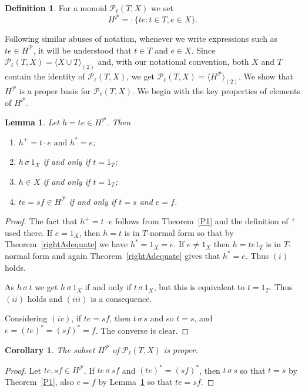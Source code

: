 \documentclass[12pt]{amsart}
\newtheorem{lem}[them]{Lemma}
\newtheorem{cor}[them]{Corollary}
\theoremstyle{definition}
\newtheorem{defn}[them]{Definition}
\theoremstyle{definition}
\numberwithin{them}{section}
\numberwithin{equation}{section}
\begin{document}
{{\begin{defn}\label{defn:H} For a monoid $\mathcal{P}_{\ell}(T,X)$ we set
\[H^{\mathcal{P}}=: \{ te:t\in T, e\in X\}.\]\end{defn}

 Following similar abuses of notation, whenever we write expressions such as $te\in H^{\mathcal{P}}$, it will be understood that $t\in T$ and $e\in X$. 
Since $\mathcal{P}_{\ell}(T,X)=\langle X\cup T\rangle_{(2)}$  
and, with our notational convention, both $X$ and $T$ contain the identity of  $\mathcal{P}_{\ell}(T,X)$, we get
$\mathcal{P}_{\ell}(T,X)=\langle H^{\mathcal{P}}\rangle_{(2)}$. 
We  show that $H^{\mathcal{P}}$ is a proper   basis for $\mathcal{P}_{\ell}(T,X)$. We begin with  the key properties of  elements of $H^{\mathcal{P}}$. 

\begin{lem}\label{lem:HH}  Let  $h=te\in H^{\mathcal{P}}$. Then
\begin{enumerate} 
\item[$(i)$]
$h^+=t\cdot e\mbox{ and }h^*=e$;
\item[$(ii)$] $h\,\sigma\, 1_X$ if and only if $t=1_T$;
\item[$(iii)$] 
$h\in X$ if and only if $t=1_T$;
\item[$(iv)$]   $te=sf\in H^{\mathcal{P}}$ if and only if $t=s$ and $e=f$.\end{enumerate} 
\end{lem}
\begin{proof}  The fact that $h^+=t\cdot e$ follows from Theorem~\ref{P1} and the definition of $^+$ used there. If $e=1_X$, then $h=t$  is in $T$-normal form so that by Theorem~\ref{rightAdequate} we have $h^*=1_X=e$. If $e\neq 1_X$ then $h=te1_T$ is in $T$-normal form and again Theorem~\ref{rightAdequate} gives that $h^*=e$. Thus $(i)$ holds.

As  $h\,\sigma\, t$ we get $h\,\sigma\, 1_X$ if and only if $t\,\sigma\, 1_X$, but this is equivalent to $t=1_T$.  Thus $(ii)$ holds and $(iii)$ is a consequence.

Considering $(iv)$, if $te=sf$, then $t\,\sigma\, s$ and so $t=s$, and  $e=(te)^*=(sf)^*=f$. The converse is clear. 
\end{proof}

\begin{cor}\label{cor:proper} The subset $H^{\mathcal{P}}$ of $\mathcal{P}_{\ell}(T,X)$ is proper.
\end{cor}
\begin{proof} Let $te,sf\in H^{\mathcal{P}}$.
If $te\,\sigma\, sf$ and $(te)^*=(sf)^*$, then $t\,\sigma\, s$ so that $t=s$ by Theorem~\ref{P1}, also $e=f$ by Lemma~\ref{lem:HH} so that $te=sf$.   \end{proof}

}}
\end{document}
